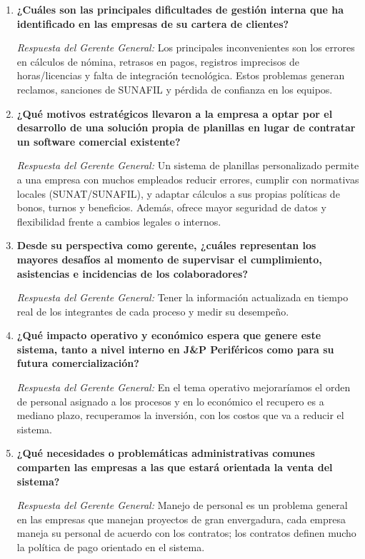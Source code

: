 \begin{enumerate}[leftmargin=*, label=\textbf{P\arabic*.}]
    \item \textbf{¿Cuáles son las principales dificultades de gestión interna que ha identificado en las empresas de su cartera de clientes?}
    
    \textit{Respuesta del Gerente General:} Los principales inconvenientes son los errores en cálculos de nómina, retrasos en pagos, registros imprecisos de horas/licencias y falta de integración tecnológica. Estos problemas generan reclamos, sanciones de SUNAFIL y pérdida de confianza en los equipos.

    \item \textbf{¿Qué motivos estratégicos llevaron a la empresa a optar por el desarrollo de una solución propia de planillas en lugar de contratar un software comercial existente?}
    
    \textit{Respuesta del Gerente General:} Un sistema de planillas personalizado permite a una empresa con muchos empleados reducir errores, cumplir con normativas locales (SUNAT/SUNAFIL), y adaptar cálculos a sus propias políticas de bonos, turnos y beneficios. Además, ofrece mayor seguridad de datos y flexibilidad frente a cambios legales o internos.

    \item \textbf{Desde su perspectiva como gerente, ¿cuáles representan los mayores desafíos al momento de supervisar el cumplimiento, asistencias e incidencias de los colaboradores?}
    
    \textit{Respuesta del Gerente General:} Tener la información actualizada en tiempo real de los integrantes de cada proceso y medir su desempeño.

    \item \textbf{¿Qué impacto operativo y económico espera que genere este sistema, tanto a nivel interno en J\&P Periféricos como para su futura comercialización?}
    
    \textit{Respuesta del Gerente General:} En el tema operativo mejoraríamos el orden de personal asignado a los procesos y en lo económico el recupero es a mediano plazo, recuperamos la inversión, con los costos que va a reducir el sistema.

    \item \textbf{¿Qué necesidades o problemáticas administrativas comunes comparten las empresas a las que estará orientada la venta del sistema?}
    
    \textit{Respuesta del Gerente General:} Manejo de personal es un problema general en las empresas que manejan proyectos de gran envergadura, cada empresa maneja su personal de acuerdo con los contratos; los contratos definen mucho la política de pago orientado en el sistema.
\end{enumerate}

